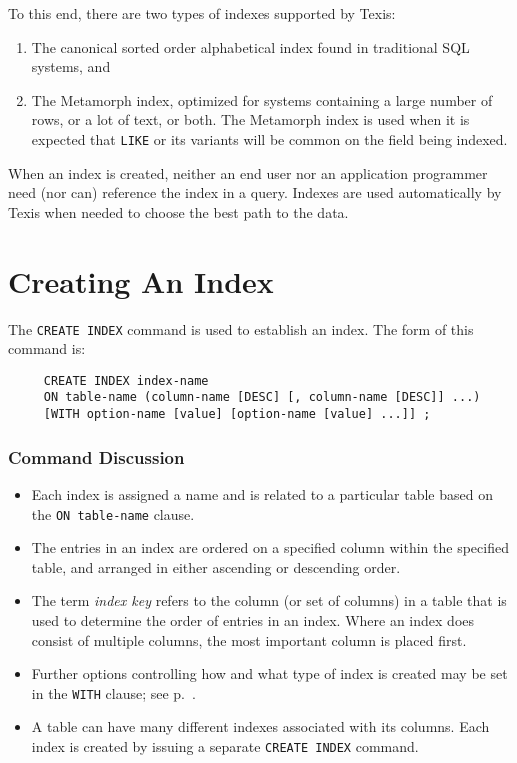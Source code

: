 To this end, there are two types of indexes supported by Texis:

\begin{enumerate}
\item The canonical sorted order alphabetical index found in
traditional SQL systems, and

\item The Metamorph index, optimized for systems containing a large
number of rows, or a lot of text, or both.  The Metamorph index is
used when it is expected that \verb`LIKE` or its variants will be
common on the field being indexed.
\end{enumerate}

When an index is created, neither an end user nor an application
programmer need (nor can) reference the index in a query.  Indexes are
used automatically by Texis when needed to choose the best path to the
data.

\section{Creating An Index}

The {\tt CREATE INDEX} command is used to establish an index.  The form of
this command is:

\begin{verbatim}
     CREATE INDEX index-name
     ON table-name (column-name [DESC] [, column-name [DESC]] ...)
     [WITH option-name [value] [option-name [value] ...]] ;
\end{verbatim}

\subsubsection{Command Discussion}

\begin{itemize}
\item Each index is assigned a name and is related to a particular
table based on the {\tt ON table-name} clause.

\item The entries in an index are ordered on a specified column within
the specified table, and arranged in either ascending or descending order.

\item The term {\em index key} refers to the column (or set of
columns) in a table that is used to determine the order of entries in
an index.  Where an index does consist of multiple columns, the most
important column is placed first.

\item Further options controlling how and what type of index is created
      may be set in the {\tt WITH} clause; see p.~\pageref{IndexOptions}.

\item A table can have many different indexes associated with its
columns.  Each index is created by issuing a separate {\tt CREATE INDEX}
command.
\end{itemize}

